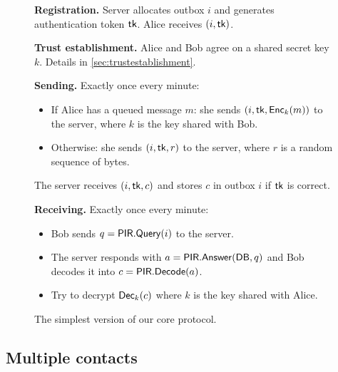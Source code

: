 \begin{figure}
    \begin{framed}
    {\raggedright
        \small
    
    \begin{hangparas}{1em}{1}

        \textbf{Registration.}
            Server allocates outbox $i$ and generates authentication token $\authtoken$.
            Alice receives $(i, \authtoken)$.
    
    \medskip

        \textbf{Trust establishment.}
            Alice and Bob agree on a shared secret key $k$. Details in \cref{sec:trustestablishment}.

            \medskip

        \textbf{Sending.}
            Exactly once every minute: \begin{itemize}
                \item If Alice has a queued message $m$: she sends $(i, \authtoken, \enc_k(m))$ to the server, where $k$ is the key shared with Bob.
                \item Otherwise: she sends $(i, \authtoken, r)$ to the server, where $r$ is a random sequence of bytes.
            \end{itemize}
            The server receives $(i, \authtoken, c)$ and stores $c$ in outbox $i$ if $\authtoken$ is correct.

    \medskip

        
        \textbf{Receiving.} Exactly once every minute:
      \begin{itemize}
        \item Bob sends $q = \mathsf{PIR.Query}(i)$ to the server.
        \item The server responds with $a = \mathsf{PIR.Answer}(\mathsf{DB}, q)$ and Bob decodes it into $c = \mathsf{PIR.Decode}(a)$.
        \item Try to decrypt $\mathsf{Dec}_k(c)$ where $k$ is the key shared with Alice.
      \end{itemize}
    \end{hangparas}
    }
    \end{framed}
    \caption{The simplest version of our core protocol.}
    \label{fig:simple}
\end{figure}

\subsection{Multiple contacts}

